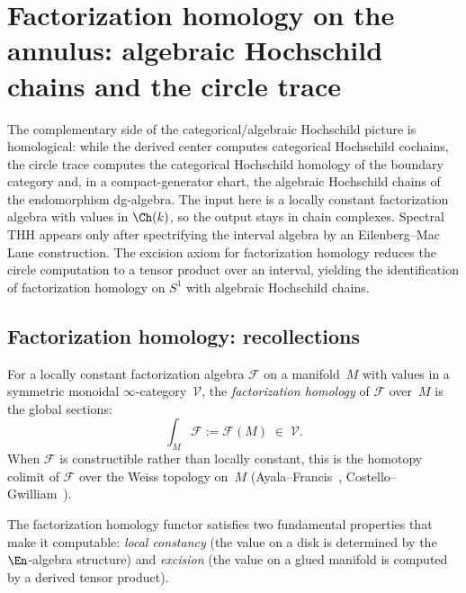 \section{Factorization homology on the annulus: algebraic Hochschild chains and the circle trace}
\label{sec:annulus-hochschild-chains}


The complementary side of the categorical/algebraic Hochschild
picture is homological: while the derived center computes
categorical Hochschild cochains, the circle trace computes the
categorical Hochschild homology of the boundary category and, in a
compact-generator chart, the algebraic Hochschild chains of the
endomorphism dg-algebra. The input here is a locally constant
factorization algebra with values in $\Ch(k)$, so the output stays
in chain complexes. Spectral $\mathrm{THH}$ appears only after
spectrifying the interval algebra by an Eilenberg--Mac Lane
construction. The excision axiom for factorization homology
reduces the circle computation to a tensor product over an interval,
yielding the identification of factorization homology on $S^1$
with algebraic Hochschild chains.

\subsection{Factorization homology: recollections}

\begin{definition}
\label{def:factorization-homology-manifold}
For a locally constant factorization algebra $\mathcal{F}$ on a
manifold~$M$ with values in a symmetric monoidal
$\infty$-category~$\mathcal{V}$, the \emph{factorization homology}
of $\mathcal{F}$ over~$M$ is the global sections:
\[
\int_M \mathcal{F}
:= \mathcal{F}(M)
\;\in\; \mathcal{V}.
\]
When $\mathcal{F}$ is constructible rather than locally constant,
this is the homotopy colimit of $\mathcal{F}$ over the
Weiss topology on~$M$
\textup{(}Ayala--Francis~\cite{AF15},
Costello--Gwilliam~\cite{CG17}\textup{)}.
\end{definition}

The factorization homology functor satisfies two fundamental
properties that make it computable: \emph{local constancy} (the
value on a disk is determined by the $\En$-algebra structure) and
\emph{excision} (the value on a glued manifold is computed by a
derived tensor product).

